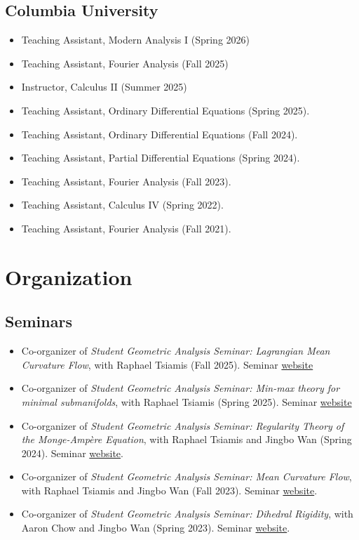 \documentclass{cv_style}
\begin{document}
		\subsection{Columbia University}
		\begin{itemize}
        \item Teaching Assistant, Modern Analysis I (Spring 2026)
        \item Teaching Assistant, Fourier Analysis (Fall 2025)
        \item Instructor, Calculus II (Summer 2025)
            \item Teaching Assistant, Ordinary Differential Equations (Spring 2025).
            \item Teaching Assistant, Ordinary Differential Equations (Fall 2024). 
			\item Teaching Assistant, Partial Differential Equations (Spring 2024).
			\item Teaching Assistant, Fourier Analysis (Fall 2023).
            \item Teaching Assistant, Calculus IV (Spring 2022).
			\item Teaching Assistant, Fourier Analysis (Fall 2021).
		\end{itemize}
		
	\section{Organization}
	
	\subsection{Seminars}
	\begin{itemize}
        \item Co-organizer of \textit{Student Geometric Analysis Seminar: Lagrangian Mean Curvature Flow}, with Raphael Tsiamis (Fall 2025). Seminar \href{https://sites.google.com/view/rtsiamis/lagrangian-mean-curvature-flow?authuser=1}{website}
        \item Co-organizer of \textit{Student Geometric Analysis Seminar: Min-max theory for minimal submanifolds}, with Raphael Tsiamis (Spring 2025). Seminar \href{https://sites.google.com/view/rtsiamis/min-max-theory-for-minimal-submanifolds-spring-2025}{website}
		\item Co-organizer of \textit{Student Geometric Analysis Seminar: Regularity Theory of the Monge-Amp\`ere Equation}, with Raphael Tsiamis and Jingbo Wan (Spring 2024). Seminar \href{https://math.columbia.edu/~ypharry/seminar/ma}{website}.
        \item Co-organizer of \textit{Student Geometric Analysis Seminar: Mean Curvature Flow}, with Raphael Tsiamis and Jingbo Wan (Fall 2023). Seminar \href{https://math.columbia.edu/~ypharry/seminar/mcf}{website}.
        \item Co-organizer of \textit{Student Geometric Analysis Seminar: Dihedral Rigidity}, with Aaron Chow and Jingbo Wan (Spring 2023). Seminar \href{https://math.columbia.edu/~ypharry/seminar/dihedral-rigidity.html}{website}.
	\end{itemize}
	
\end{document}
